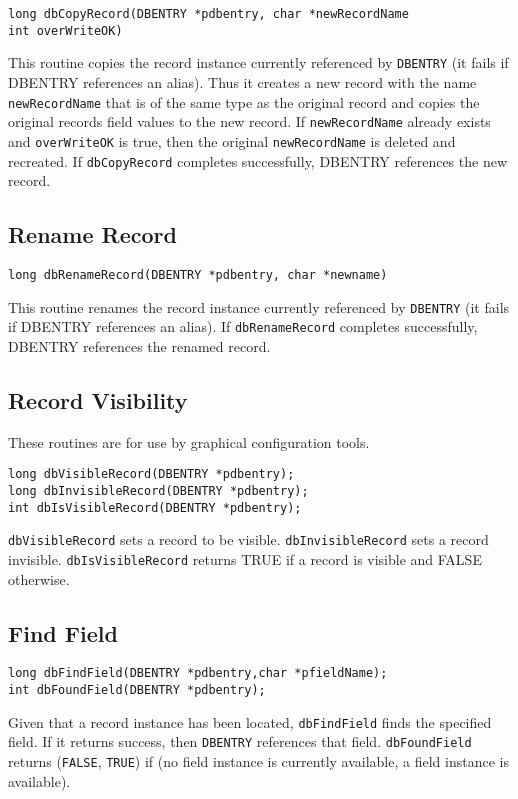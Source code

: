 \begin{verbatim}long dbCopyRecord(DBENTRY *pdbentry, char *newRecordName
int overWriteOK)
\end{verbatim}This routine copies the record instance currently referenced by \verb|DBENTRY| (it fails if DBENTRY references an alias). Thus 
it creates a new record with the name \verb|newRecordName| that is of the same type as the original record and copies the 
original records field values to the new record. If \verb|newRecordName| already exists and \verb|overWriteOK| is true, then the 
original \verb|newRecordName| is deleted and recreated. If \verb|dbCopyRecord| completes successfully, DBENTRY references 
the new record.

\subsection{Rename Record}

\begin{verbatim}long dbRenameRecord(DBENTRY *pdbentry, char *newname)
\end{verbatim}This routine renames the record instance currently referenced by \verb|DBENTRY| (it fails if DBENTRY references an alias). If 
\verb|dbRenameRecord| completes successfully, DBENTRY references the renamed record.

\subsection{Record Visibility}

These routines are for use by graphical configuration tools.

\begin{verbatim}long dbVisibleRecord(DBENTRY *pdbentry);
long dbInvisibleRecord(DBENTRY *pdbentry);
int dbIsVisibleRecord(DBENTRY *pdbentry);
\end{verbatim}
\verb|dbVisibleRecord| sets a record to be visible. \verb|dbInvisibleRecord| sets a record invisible. 
\verb|dbIsVisibleRecord| returns TRUE if a record is visible and FALSE otherwise.

\subsection{Find Field}

\begin{verbatim}long dbFindField(DBENTRY *pdbentry,char *pfieldName);
int dbFoundField(DBENTRY *pdbentry);

\end{verbatim}
Given that a record instance has been located, \verb|dbFindField| finds the specified field. If it returns success, then 
\verb|DBENTRY| references that field. \verb|dbFoundField| returns (\verb|FALSE|, \verb|TRUE|) if (no field instance is currently available, a 
field instance is available).

